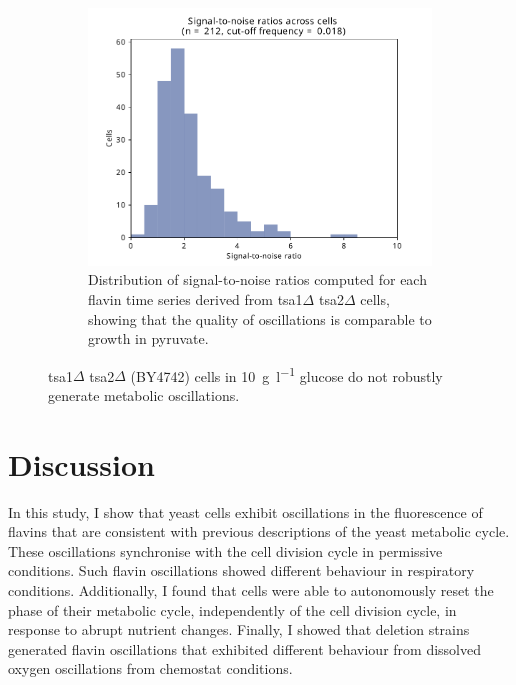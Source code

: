 \begin{figure}
  \begin{subfigure}[t]{0.45\textwidth}
   \centering
   \includegraphics[width=\textwidth]{tsa1tsa2morgan_1649_10.pdf}
   \caption{
    Distribution of signal-to-noise ratios computed for each flavin time series derived from tsa1$\Delta$ tsa2$\Delta$ cells, showing that the quality of oscillations is comparable to growth in pyruvate.
   }
   \label{fig:biology-tsa1tsa2-snr}
  \end{subfigure}%

  \caption{
    tsa1$\Delta$ tsa2$\Delta$ (BY4742) cells in \SI{10}{\gram~\litre^{-1}} glucose do not robustly generate metabolic oscillations.
  }
  \label{fig:biology-tsa1tsa2}
\end{figure}


\section{Discussion}
\label{sec:biology-discussion}

In this study, I show that yeast cells exhibit oscillations in the fluorescence of flavins that are consistent with previous descriptions of the yeast metabolic cycle.
These oscillations synchronise with the cell division cycle in permissive conditions.
Such flavin oscillations showed different behaviour in respiratory conditions.
Additionally, I found that cells were able to autonomously reset the phase of their metabolic cycle, independently of the cell division cycle, in response to abrupt nutrient changes.
Finally, I showed that deletion strains generated flavin oscillations that exhibited different behaviour from dissolved oxygen oscillations from chemostat conditions.

